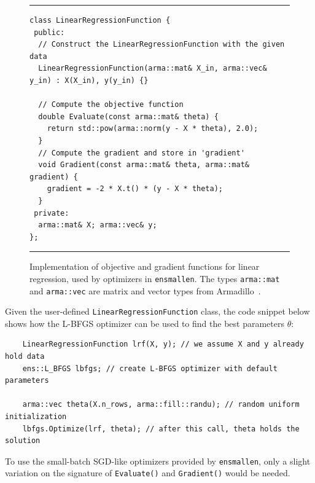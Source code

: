 \documentclass{article}
\begin{document}
\begin{figure}[!tb]
\hrule\vspace*{0.5ex}
\begin{adjustbox}{scale={0.95}{0.90}}
\begin{minipage}{\textwidth}
\begin{verbatim}
class LinearRegressionFunction {
 public:
  // Construct the LinearRegressionFunction with the given data
  LinearRegressionFunction(arma::mat& X_in, arma::vec& y_in) : X(X_in), y(y_in) {}

  // Compute the objective function
  double Evaluate(const arma::mat& theta) {
    return std::pow(arma::norm(y - X * theta), 2.0);
  }
  // Compute the gradient and store in 'gradient'
  void Gradient(const arma::mat& theta, arma::mat& gradient) {
    gradient = -2 * X.t() * (y - X * theta);
  }
 private:
  arma::mat& X; arma::vec& y;
};
\end{verbatim}
\end{minipage}
\end{adjustbox}
\vspace*{0.5ex}\hrule\vspace*{0.5ex}
\caption
  {
  Implementation of objective and gradient functions for linear regression,
  used by optimizers in \texttt{ensmallen}.
  The types {\footnotesize\tt arma::mat} and {\footnotesize\tt arma::vec}
  are matrix and vector types
  from Armadillo~\cite{sanderson2016armadillo}.
  }
\label{fig:LinearRegressionFunction}
\end{figure}

Given the user-defined {\tt LinearRegressionFunction} class,
the code snippet below
shows how the L-BFGS optimizer can be used to find the best parameters $\theta$:

\vspace*{-0.4em}
\begin{verbatim}
    LinearRegressionFunction lrf(X, y); // we assume X and y already hold data
    ens::L_BFGS lbfgs; // create L-BFGS optimizer with default parameters

    arma::vec theta(X.n_rows, arma::fill::randu); // random uniform initialization
    lbfgs.Optimize(lrf, theta); // after this call, theta holds the solution
\end{verbatim}
\vspace*{-0.4em}

To use the small-batch SGD-like optimizers provided by {\tt ensmallen},
only a slight variation on the signature of \texttt{\small Evaluate()} and
\texttt{\small Gradient()} would be needed.
\end{document}
